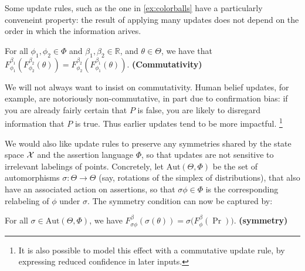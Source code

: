 \documentclass{article}
\begin{document}
Some update rules, such as the one in \cref{ex:colorballs} have a particularly conveneint property: the result of applying many updates does not depend on the order in which the information arives.

\begin{URaxioms}
    \item For all $\phi_1, \phi_2 \in \Phi$ and $\beta_1, \beta_2 \in \mathbb R$, and
    $\theta \in \Theta$,
    we have that
    $
        F^{\beta_1}_{\phi_1} ( F^{\beta_2}_{\phi_2}(\theta)) =
            F^{\beta_2}_{\phi_2} ( F^{\beta_1}_{\phi_1}(\theta)).
    $
    \hfill\textbf{(Commutativity)} \label{ax:commute}
\end{URaxioms}

We will not always want to insist on commutativity. Human belief updates, for example, are notoriously non-commutative, in part due to confirmation bias:
if you are already fairly certain that $P$ is false, you are likely to disregard
information that $P$ is true. Thus earlier updates tend to be more impactful.%
\footnote{
    It is also possible to model this effect with a commutative update rule,
    by expressing reduced confidence in later inputs.
}


We would also like update rules to preserve any symmetries shared by the state space $\mathcal X$ and the assertion language $\Phi$, so that updates are not sensitive to irrelevant labelings of points.
Concretely, let $\mathrm{Aut}(\Theta, \Phi)$ be the set of automorphisms $\sigma : \Theta \to \Theta$ (say, rotations of the simplex of distributions), that also have an associated action on assertions, so that $\sigma\phi \in \Phi$ is the corresponding relabeling of $\phi$ under $\sigma$.  The symmetry condition can now be captured by:

\begin{URaxioms}
    \item
        For all $\sigma
            \in \mathrm{Aut}(\Theta, \Phi)$, we have
        $F^\beta_{\sigma\phi} (\sigma(\theta)) = \sigma \Big( F^\beta_{\phi}(\Pr)\Big)$.
            \hfill \textbf{(symmetry)} \label{ax:symmetry}
        \\
\end{URaxioms}
\end{document}
